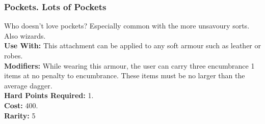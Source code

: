 \subsubsection{Pockets. Lots of Pockets}
Who doesn’t love pockets? Especially common with the more unsavoury sorts. Also wizards.\\
\textbf{Use With:} This attachment can be applied to any soft armour such as leather or robes.\\
\textbf{Modifiers:} While wearing this armour, the user can carry three encumbrance 1 items at no penalty to encumbrance. These items must be no larger than the average dagger.\\
\textbf{Hard Points Required:} 1.\\
\textbf{Cost:} 400.\\
\textbf{Rarity:} 5\\
